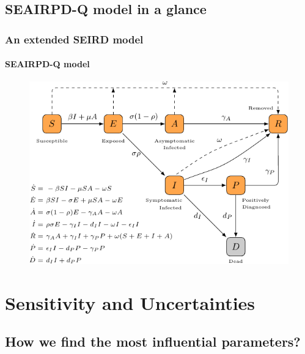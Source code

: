 \documentclass{beamer}
\begin{document}
\subsection{SEAIRPD-Q model in a glance}

\begin{frame} 
\frametitle{An extended SEIRD model} 
\framesubtitle{SEAIRPD-Q model} 

\begin{figure}
	\centering
	\includegraphics[width=1\textwidth]{./figs/final_schem_no_eta-crop.pdf}
\end{figure}

\end{frame}

\section{Sensitivity and Uncertainties}

\subsection{How we find the most influential parameters?}
\end{document}
